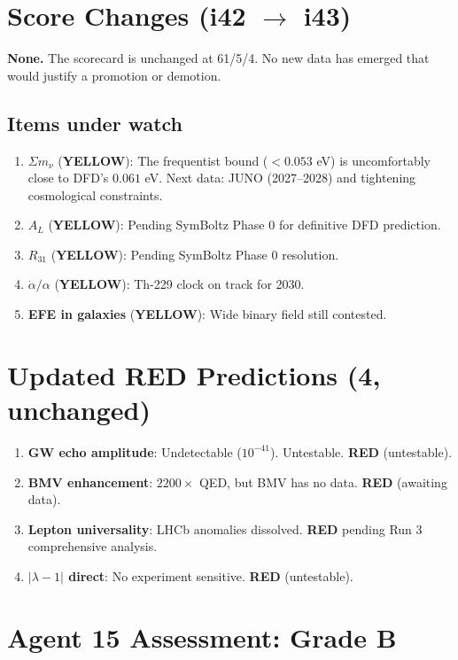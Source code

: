 \documentclass[11pt,a4paper]{article}
\newcommand{\YELLOW}{\textcolor{dfdyellow}{\textbf{YELLOW}}}
\newcommand{\RED}{\textcolor{dfdred}{\textbf{RED}}}
\begin{document}
\section{Score Changes (i42 $\to$ i43)}

\textbf{None.} The scorecard is unchanged at 61/5/4. No new data has emerged that would justify a promotion or demotion.

\subsection{Items under watch}

\begin{enumerate}
\item \textbf{$\Sigma m_\nu$} (\YELLOW): The frequentist bound ($< 0.053$ eV) is uncomfortably close to DFD's $0.061$ eV. Next data: JUNO (2027--2028) and tightening cosmological constraints.
\item \textbf{$A_L$} (\YELLOW): Pending SymBoltz Phase 0 for definitive DFD prediction.
\item \textbf{$R_{31}$} (\YELLOW): Pending SymBoltz Phase 0 resolution.
\item \textbf{$\dot{\alpha}/\alpha$} (\YELLOW): Th-229 clock on track for 2030.
\item \textbf{EFE in galaxies} (\YELLOW): Wide binary field still contested.
\end{enumerate}

\section{Updated RED Predictions (4, unchanged)}

\begin{enumerate}
\item \textbf{GW echo amplitude}: Undetectable ($10^{-41}$). Untestable. \RED{} (untestable).
\item \textbf{BMV enhancement}: $2200\times$ QED, but BMV has no data. \RED{} (awaiting data).
\item \textbf{Lepton universality}: LHCb anomalies dissolved. \RED{} pending Run 3 comprehensive analysis.
\item \textbf{$|\lambda-1|$ direct}: No experiment sensitive. \RED{} (untestable).
\end{enumerate}

\section{Agent 15 Assessment: Grade B}
\end{document}
